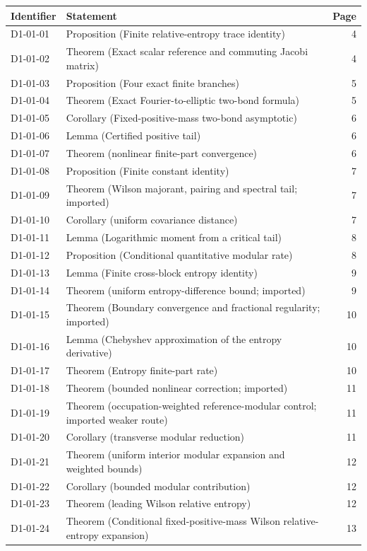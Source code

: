 \documentclass[11pt,a4paper]{article}
\begin{document}
{\footnotesize\begin{longtable}{@{}l>{\raggedright\arraybackslash}p{}r@{}}
\toprule Identifier & Statement & Page\\\midrule\endhead
D1-01-01 & Proposition (Finite relative-entropy trace identity) & 4\\
D1-01-02 & Theorem (Exact scalar reference and commuting Jacobi matrix) & 4\\
D1-01-03 & Proposition (Four exact finite branches) & 5\\
D1-01-04 & Theorem (Exact Fourier-to-elliptic two-bond formula) & 5\\
D1-01-05 & Corollary (Fixed-positive-mass two-bond asymptotic) & 6\\
D1-01-06 & Lemma (Certified positive tail) & 6\\
D1-01-07 & Theorem (nonlinear finite-part convergence) & 6\\
D1-01-08 & Proposition (Finite constant identity) & 7\\
D1-01-09 & Theorem (Wilson majorant, pairing and spectral tail; imported) & 7\\
D1-01-10 & Corollary (uniform covariance distance) & 7\\
D1-01-11 & Lemma (Logarithmic moment from a critical tail) & 8\\
D1-01-12 & Proposition (Conditional quantitative modular rate) & 8\\
D1-01-13 & Lemma (Finite cross-block entropy identity) & 9\\
D1-01-14 & Theorem (uniform entropy-difference bound; imported) & 9\\
D1-01-15 & Theorem (Boundary convergence and fractional regularity; imported) & 10\\
D1-01-16 & Lemma (Chebyshev approximation of the entropy derivative) & 10\\
D1-01-17 & Theorem (Entropy finite-part rate) & 10\\
D1-01-18 & Theorem (bounded nonlinear correction; imported) & 11\\
D1-01-19 & Theorem (occupation-weighted reference-modular control; imported weaker route) & 11\\
D1-01-20 & Corollary (transverse modular reduction) & 11\\
D1-01-21 & Theorem (uniform interior modular expansion and weighted bounds) & 12\\
D1-01-22 & Corollary (bounded modular contribution) & 12\\
D1-01-23 & Theorem (leading Wilson relative entropy) & 12\\
D1-01-24 & Theorem (Conditional fixed-positive-mass Wilson relative-entropy expansion) & 13\\
\bottomrule\end{longtable}}
\end{document}
